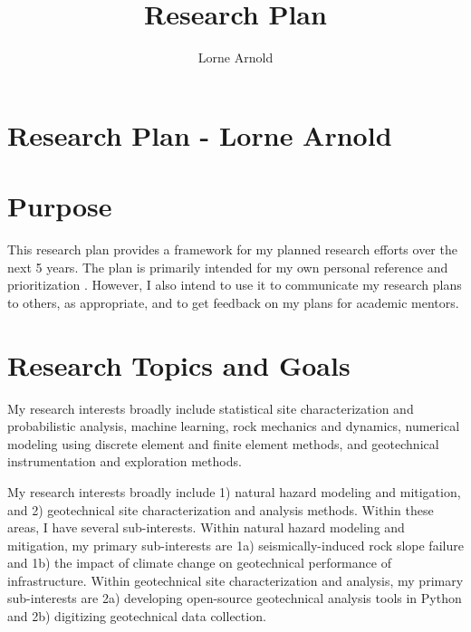 \documentclass[10pt,letterpaper]{article}
\author{Lorne Arnold}
\title{Research Plan}
\begin{document}
\section*{Research Plan - Lorne Arnold}
\section{Purpose}
This research plan provides a framework for my planned research efforts over the next 5 years.
The plan is primarily intended for my own personal reference and prioritization .
However, I also intend to use it to communicate my research plans to others, as appropriate, and to get feedback on my plans for academic mentors.

\section{Research Topics and Goals}
My research interests broadly include statistical site characterization and probabilistic analysis, machine learning, rock mechanics and dynamics, numerical modeling using discrete element and finite element methods, and geotechnical instrumentation and exploration methods.

My research interests broadly include 1) natural hazard modeling and mitigation, and 2) geotechnical site characterization and analysis methods.
Within these areas, I have several sub-interests. 
Within natural hazard modeling and mitigation, my primary sub-interests are 1a) seismically-induced rock slope failure and 1b) the impact of climate change on geotechnical performance of infrastructure.
Within geotechnical site characterization and analysis, my primary sub-interests are 2a) developing open-source geotechnical analysis tools in Python and 2b) digitizing geotechnical data collection. 
\end{document}
